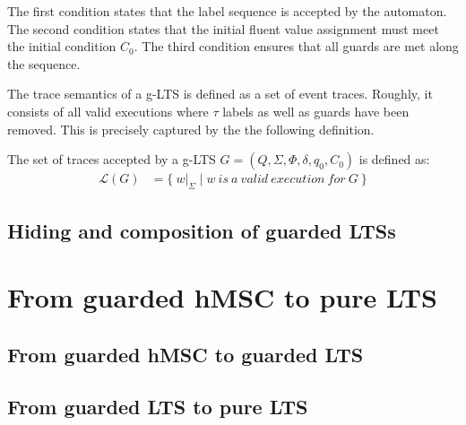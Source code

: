 The first condition states that the label sequence is accepted by the automaton. The second condition states that the initial fluent value assignment must meet the initial condition $C_0$. The third condition ensures that all guards are met along the sequence.

The trace semantics of a g-LTS is defined as a set of event traces. Roughly, it consists of all valid executions where $\tau$ labels as well as guards have been removed. This is precisely captured by the the following definition.

\begin{definition}
The set of traces accepted by a g-LTS $G = (Q,\Sigma,\Phi,\delta,q_{0},C_{0})$ is defined as:
\begin{align*}
\mathcal{L}(G) &= \{~w|_{\Sigma} \mid w~is~a~valid~execution~for~G~\}
\end{align*}

\end{definition}
\subsection{Hiding and composition of guarded LTSs}

\section{From guarded hMSC to pure LTS}

\subsection{From guarded hMSC to guarded LTS}
\subsection{From guarded LTS to pure LTS}
